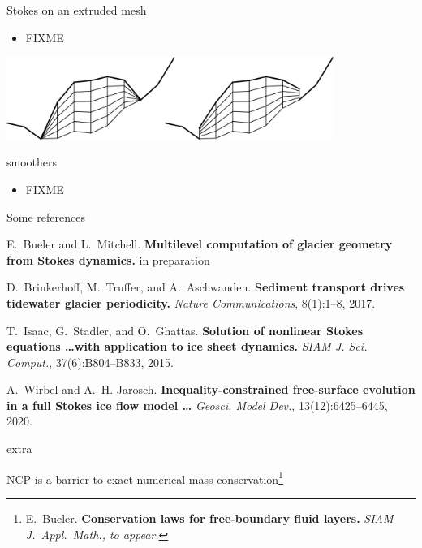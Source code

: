 \documentclass[usepdftitle=false]{beamer}
\begin{document}
\begin{frame}{Stokes on an extruded mesh}

\begin{itemize}
\item FIXME
\end{itemize}

\includegraphics[width=0.8\textwidth]{figs/extruded.png}
\end{frame}


\begin{frame}{smoothers}

\begin{itemize}
\item FIXME
\end{itemize}
\end{frame}






\appendix

\begin{frame}{Some references}
%
%

\begin{thebibliography}{1}
E.~Bueler and L.~Mitchell. \textbf{Multilevel computation of glacier geometry from Stokes dynamics.} in preparation

\hrulefill

D.~Brinkerhoff, M.~Truffer, and A.~Aschwanden. \textbf{Sediment transport drives tidewater glacier periodicity.} {\em Nature Communications}, 8(1):1--8, 2017.

T.~Isaac, G.~Stadler, and O.~Ghattas.  \textbf{Solution of nonlinear Stokes equations \dots with application to ice sheet dynamics.} {\em SIAM J. Sci. Comput.}, 37(6):B804--B833, 2015.

A.~Wirbel and A.~H. Jarosch. \textbf{Inequality-constrained free-surface evolution in a full {S}tokes ice flow model \dots} {\em Geosci. Model Dev.}, 13(12):6425--6445, 2020.
\end{thebibliography}
\end{frame}

\begin{frame}{extra}

NCP is a barrier to exact numerical mass conservation\footnote{E.~Bueler. \textbf{Conservation laws for free-boundary fluid layers.} \em{SIAM J.~Appl.~Math.}, to appear.}
\end{frame}
\end{document}
